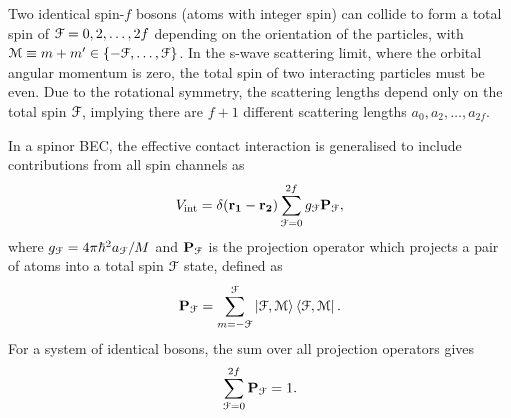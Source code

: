 Two identical spin-\(f\) bosons (atoms with integer spin) can collide to form a
total spin of \(\EuScript{F} = 0, 2, \ldots, 2f\) depending on the orientation
of the particles, with \(\EuScript{M} \equiv m+m' \in
\{-\EuScript{F}, \ldots, \EuScript{F}\} \).
In the s-wave scattering limit, where the orbital angular momentum is zero,
the total spin of two interacting particles must be even.
Due to the rotational symmetry, the scattering lengths depend only on the total
spin \(\EuScript{F}\), implying there are \(f + 1\) different scattering lengths
\(a_0, a_2, \ldots, a_{2f}\).

In a spinor BEC, the effective contact interaction is generalised to include
contributions from all spin channels as
\begin{equation}\label{eq: spin-f-interaction-potential}
    V_\mathrm{int} = \delta(\vb{r_1} - \vb{r_2})
    \sum_{\EuScript{F}=0}^{2f}g_\EuScript{F}\vb{P}_\EuScript{F},
\end{equation}
where \(g_\EuScript{F}=4\pi\hbar^2a_\EuScript{F}/M\) and
\(\vb{P}_\EuScript{F}\) is the projection operator which projects a pair
of atoms into a total spin \(\EuScript{F}\) state, defined as
\begin{equation}
    \vb{P}_\EuScript{F} = \sum_{m=-\EuScript{F}}^{\EuScript{F}}
    \ket{\EuScript{F}, \EuScript{M}}\bra{\EuScript{F}, \EuScript{M}}.
\end{equation}
For a system of identical bosons, the sum over all projection operators gives
\begin{equation}\label{eq: completeness-relation}
    \sum_{\EuScript{F}=0}^{2f}\vb{P}_\EuScript{F} = 1.
\end{equation}


